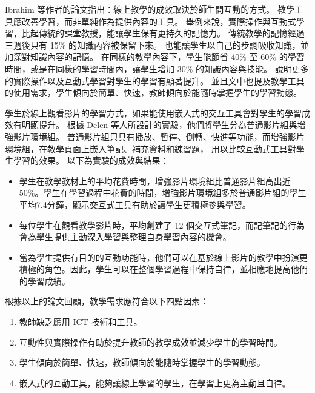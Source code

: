 \documentclass[12pt]{article}
\begin{document}
\begin{enumerate}
\begin{enumerate}
        \par Ibrahim %
        等作者的論文\cite{ref14}指出：線上教學的成效取決於師生間互動的方式。
        教學工具應改善學習，而非單純作為提供內容的工具。
        舉例來說，實際操作與互動式學習，比起傳統的課堂教授，能讓學生保有更持久的記憶力。
        傳統教學的記憶經過三週後只有 15\% 的知識內容被保留下來。
        也能讓學生以自己的步調吸收知識，並加深對知識內容的記憶。
        在同樣的教學內容下，學生能節省 40\% 至 60\% 的學習時間，或是在同樣的學習時間內，讓學生增加 30\% 的知識內容與技能。
        說明更多的實際操作以及互動式學習對學生的學習有顯著提升。
        並且文中也提及教學工具的使用需求，學生傾向於簡單、快速，教師傾向於能隨時掌握學生的學習動態。
        
        \par 學生於線上觀看影片的學習方式，如果能使用嵌入式的交互工具會對學生的學習成效有明顯提升。
        根據 Delen 等人所設計的實驗\cite{ref18}，他們將學生分為普通影片組與增強影片環境組。
        普通影片組只具有播放、暫停、倒轉、快進等功能，而增強影片環境組，在教學頁面上嵌入筆記、補充資料和練習題，
        用以比較互動式工具對學生學習的效果。
        以下為實驗的成效與結果：
        \begin{itemize}
          \item 學生在教學教材上的平均花費時間，增強影片環境組比普通影片組高出近 50\%。學生在學習過程中花費的時間，增強影片環境組多於普通影片組的學生平均7.4分鐘，顯示交互式工具有助於讓學生更積極參與學習。 
          \item 每位學生在觀看教學影片時，平均創建了 12 個交互式筆記，而記筆記的⾏為會為學生提供主動深入學習與整理自身學習內容的機會。 
          \item 當為學生提供有目的的互動功能時，他們可以在基於線上影片的教學中扮演更積極的角色。因此，學生可以在整個學習過程中保持自律，並相應地提高他們的學習成績。
        \end{itemize}

        \par 根據以上的論文回顧，教學需求應符合以下四點因素：
        \begin{enumerate}[label=(\arabic*), itemindent=24pt] %
          \item 教師缺乏應用 ICT 技術和工具。
          \item 互動性與實際操作有助於提升教師的教學成效並減少學生的學習時間。
          \item 學生傾向於簡單、快速，教師傾向於能隨時掌握學生的學習動態。
          \item 嵌入式的互動工具，能夠讓線上學習的學生，在學習上更為主動且自律。
        \end{enumerate}


\end{enumerate}
\end{enumerate}
\end{document}
